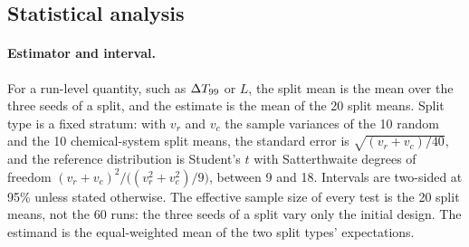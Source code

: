 \subsection{Statistical analysis}\label{sec:stats}
\paragraph{Estimator and interval.} For a run-level quantity, such as $\Delta T_{99}$ or $L$, the split mean is the mean over the
three seeds of a split, and the estimate is the mean of the 20 split means. Split type is a fixed stratum: with $v_r$ and $v_c$ the
sample variances of the 10 random and the 10 chemical-system split means, the standard error is $\sqrt{(v_r+v_c)/40}$, and the
reference distribution is Student's $t$ with Satterthwaite degrees of freedom\cite{satterthwaite1946}
$(v_r+v_c)^2/\bigl((v_r^2+v_c^2)/9\bigr)$, between 9 and 18. Intervals are two-sided at 95\% unless stated otherwise. The effective sample size of every test is the 20 split means, not the
60 runs: the three seeds of a split vary only the initial design. The estimand is the equal-weighted mean of the two split types'
expectations.

